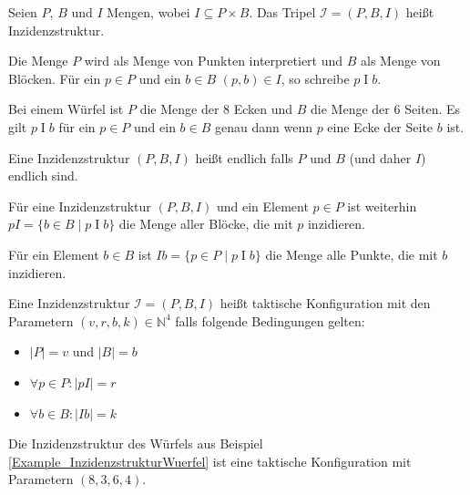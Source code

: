 \documentclass{article}
\begin{document}
\begin{definition}
 Seien $P$, $B$ und $I$ Mengen, wobei $I \subseteq P \times B$.
 Das Tripel $\mathcal{I} = (P, B, I)$ heißt Inzidenzstruktur.
 
 Die Menge $P$ wird als Menge von Punkten interpretiert und $B$ als Menge von Blöcken.
 Für ein $p \in P$ und ein $b \in B$ $(p, b) \in I$, so schreibe $p \mathrel{I} b$.
\end{definition}

\begin{example}[Würfel]\label{Example_InzidenzstrukturWuerfel}
  Bei einem Würfel ist $P$ die Menge der 8 Ecken und $B$ die Menge der 6 Seiten.
  Es gilt $p \mathrel{I} b$ für ein $p \in P$ und ein $b \in B$
  genau dann wenn $p$ eine Ecke der Seite $b$ ist.
\end{example}

\begin{definition}
  Eine Inzidenzstruktur $(P, B, I)$ heißt endlich falls $P$ und $B$ (und daher $I$) endlich sind.
\end{definition}

\begin{definition}
  Für eine Inzidenzstruktur $(P, B, I)$ und ein Element $p \in P$ ist weiterhin $pI = \{b \in B \mid p \mathrel{I} b\}$
  die Menge aller Blöcke, die mit $p$ inzidieren. 
  
  Für ein Element $b \in B$ ist $Ib = \{p \in P \mid p \mathrel{I} b\}$ die Menge alle Punkte, 
  die mit $b$ inzidieren.
\end{definition}

\begin{definition}
  Eine Inzidenzstruktur $\mathcal{I} = (P, B, I)$ heißt taktische Konfiguration mit den Parametern $(v, r, b, k) \in \mathbb{N}^4$
  falls folgende Bedingungen gelten:
  \begin{itemize}
    \item $|P| = v$ und $|B| = b$
    \item $\forall p \in P \colon |pI| = r$
    \item $\forall b \in B \colon |Ib| = k$
  \end{itemize}
\end{definition}

\begin{example}[Würfel]
  Die Inzidenzstruktur des Würfels aus Beispiel \ref{Example_InzidenzstrukturWuerfel}
  ist eine taktische Konfiguration mit Parametern $(8, 3, 6, 4)$.
\end{example}
\end{document}
